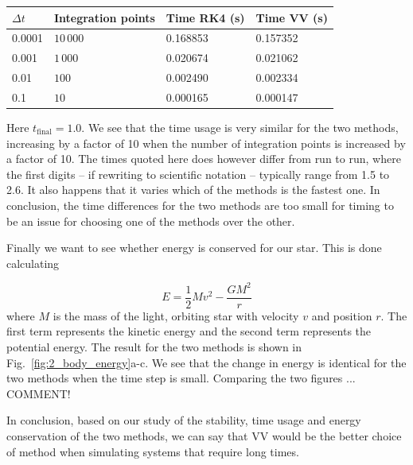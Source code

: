 \documentclass{article}
\begin{document}
\begin{multicols}{2}
\begin{center}
\begin{tabular}{ l l l l }\hline
	$\Delta t$ 				& Integration points	 	& Time RK4 (s)		& Time VV (s)		\\ \hline
	0.0001 				& $10\,000$ 			& 0.168853		& 0.157352		 \\
	0.001 				& $1\,000$ 			& 0.020674		& 0.021062		 \\
	0.01 					& $100$ 				& 0.002490		& 0.002334		 \\
	0.1 					& $10$				& 0.000165		& 0.000147		 \\
	\hline
\end{tabular}
\end{center}
Here $t_{\mathrm{final}} = 1.0$. We see that the time usage is very similar for the two methods, increasing by a factor of 10 when the number of integration points is increased by a factor of 10. The times quoted here does however differ from run to run, where the first digits -- if rewriting to scientific notation -- typically range from 1.5 to 2.6. It also happens that it varies which of the methods is the fastest one. In conclusion, the time differences for the two methods are too small for timing to be an issue for choosing one of the methods over the other.

Finally we want to see whether energy is conserved for our star. This is done calculating

\begin{equation}\label{eq:E_tot}
	E = \frac{1}{2}Mv^2 - \frac{GM^2}{r}
\end{equation}
where $M$ is the mass of the light, orbiting star with velocity $v$ and position $r$. The first term represents the kinetic energy and the second term represents the potential energy. The result for the two methods is shown in Fig.~\ref{fig:2_body_energy}a-c. We see that the change in energy is identical for the two methods when the time step is small. Comparing the two figures ... COMMENT!

In conclusion, based on our study of the stability, time usage and energy conservation of the two methods, we can say that VV would be the better choice of method when simulating systems that require long times.



\end{multicols}
\end{document}
